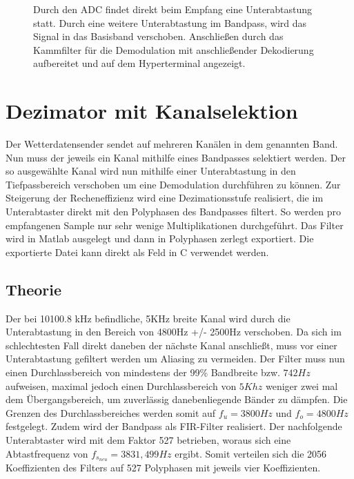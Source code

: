 \documentclass{article}
\begin{document}
\begin{figure}[!h]
    \centering
    \def\svgscale{0.5}
    \def\svgwidth{\columnwidth}
    \caption{Durch den ADC findet direkt beim Empfang eine Unterabtastung statt. Durch eine weitere Unterabtastung im Bandpass, wird das Signal in das Basisband verschoben.
    Anschließen durch das Kammfilter für die Demodulation mit anschließender Dekodierung aufbereitet und auf dem Hyperterminal angezeigt.}
    \label{fig:signal}
\end{figure}

\section{Dezimator mit Kanalselektion}\label{sec:FIR}
Der Wetterdatensender sendet auf mehreren Kanälen in dem genannten Band. Nun muss der jeweils ein Kanal mithilfe eines Bandpasses selektiert werden. Der so ausgewählte Kanal wird nun mithilfe einer Unterabtastung in den Tiefpassbereich verschoben um eine Demodulation durchführen zu können. Zur Steigerung der Recheneffizienz wird eine Dezimationsstufe realisiert, die im Unterabtaster direkt mit den Polyphasen des Bandpasses filtert. So werden pro empfangenen Sample nur sehr wenige Multiplikationen durchgeführt. Das Filter wird in Matlab ausgelegt und dann in Polyphasen zerlegt exportiert. Die exportierte Datei kann direkt als Feld in C verwendet werden.

\subsection{Theorie}
Der bei 10100.8 kHz befindliche, 5KHz breite Kanal wird durch die Unterabtastung in den Bereich von 4800Hz +/- 2500Hz verschoben. Da sich im schlechtesten Fall direkt daneben der nächste Kanal anschließt, muss vor einer Unterabtastung gefiltert werden um Aliasing zu vermeiden. Der Filter muss nun einen Durchlassbereich von mindestens der 99\% Bandbreite bzw. $742Hz$ aufweisen, maximal jedoch einen Durchlassbereich von $5Khz$ weniger zwei mal dem Übergangsbereich, um zuverlässig danebenliegende Bänder zu dämpfen. Die Grenzen des Durchlassbereiches werden somit auf $f_u = 3800Hz$ und $f_o = 4800Hz$ festgelegt. Zudem wird der Bandpass als FIR-Filter realisiert. Der nachfolgende Unterabtaster wird mit dem Faktor 527 betrieben, woraus sich eine Abtastfrequenz von $f_{s_{neu}} = 3831,499Hz$ ergibt. Somit verteilen sich die 2056 Koeffizienten des Filters auf 527 Polyphasen mit jeweils vier Koeffizienten.
\end{document}
